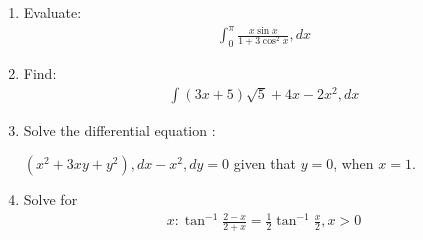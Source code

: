 \documentclass[12pt,-letter paper]{article}
\providecommand{\brak}[1]{\ensuremath{\left(#1\right)}}
\begin{document}
\begin{enumerate}
\item Evaluate: 
	\begin{align*}
		\int_0^{\pi} \frac{x \sin {x}}{1 + 3\cos^2 {x}} , dx
	\end{align*}

\item Find:
	\begin{align*}
	\int \brak{3x + 5}\sqrt{5} + 4x - 2x^2 , dx
	\end{align*}
\item Solve the differential equation :
	
	$ \brak{x^2 + 3xy + y^2} , dx - x^2 , dy = 0$ given that  $y = 0$, when  $x = 1.$


\item  Solve for
	\begin{align*}
		x : \tan^{-1}\frac{2-x}{2+x}=\frac{1}{2} \tan^{-1}\frac{x}{2}, x>0
\end{align*}
	

\end{enumerate}
\end{document}
